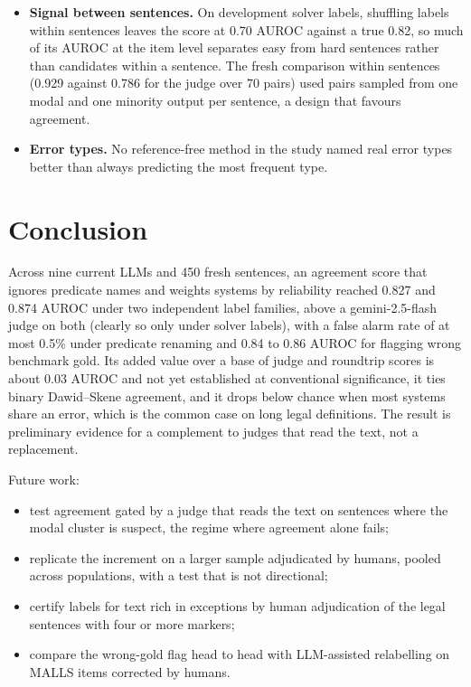 \documentclass[11pt,letterpaper]{article}
\begin{document}
\begin{itemize}
  \item \textbf{Signal between sentences.} On development solver labels, shuffling labels within sentences leaves the score at 0.70 AUROC against a true 0.82, so much of its AUROC at the item level separates easy from hard sentences rather than candidates within a sentence. The fresh comparison within sentences (0.929 against 0.786 for the judge over 70 pairs) used pairs sampled from one modal and one minority output per sentence, a design that favours agreement.
  \item \textbf{Error types.} No reference-free method in the study named real error types better than always predicting the most frequent type.
\end{itemize}

\section{Conclusion}
\label{sec:conclusion}

Across nine current LLMs and 450 fresh sentences, an agreement score that ignores predicate names and weights systems by reliability reached 0.827 and 0.874 AUROC under two independent label families, above a gemini-2.5-flash judge on both (clearly so only under solver labels), with a false alarm rate of at most 0.5\% under predicate renaming and 0.84 to 0.86 AUROC for flagging wrong benchmark gold. Its added value over a base of judge and roundtrip scores is about 0.03 AUROC and not yet established at conventional significance, it ties binary Dawid--Skene agreement, and it drops below chance when most systems share an error, which is the common case on long legal definitions. The result is preliminary evidence for a complement to judges that read the text, not a replacement.

Future work:
\begin{itemize}
  \item test agreement gated by a judge that reads the text on sentences where the modal cluster is suspect, the regime where agreement alone fails;
  \item replicate the increment on a larger sample adjudicated by humans, pooled across populations, with a test that is not directional;
  \item certify labels for text rich in exceptions by human adjudication of the legal sentences with four or more markers;
  \item compare the wrong-gold flag head to head with LLM-assisted relabelling on MALLS items corrected by humans.
\end{itemize}



\end{document}
